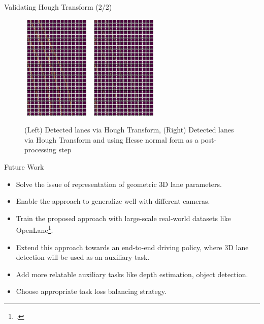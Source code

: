 \documentclass[aspectratio=169]{beamer}
\begin{document}
\begin{frame}{Validating Hough Transform (2/2)}
   

\begin{figure}

    \caption{(Left) Detected lanes via Hough Transform, (Right) Detected lanes via Hough Transform and using Hesse normal form as a post-processing step }
   \includegraphics[width=0.3\textwidth, height=5cm]{images/detected_lines_r.jpg}
   \hfill
   \includegraphics[width=0.3\textwidth,height=5cm]{images/detected_lines_rprime.jpg}
\end{figure}

\end{frame}



\begin{frame}{Future Work}

\begin{itemize}

    \item Solve the issue of representation of geometric 3D lane parameters.
    \item Enable the approach to generalize well with different cameras.
    \item Train the proposed approach with large-scale real-world datasets like OpenLane\footcite{chen2022persformer}.
    \item Extend this approach towards an end-to-end driving policy, where 3D lane detection will be used as an auxiliary task.
    \item Add more relatable auxiliary tasks like depth estimation, object detection.
    \item Choose appropriate task loss balancing strategy.  



\end{itemize}
    
\end{frame}
\end{document}
